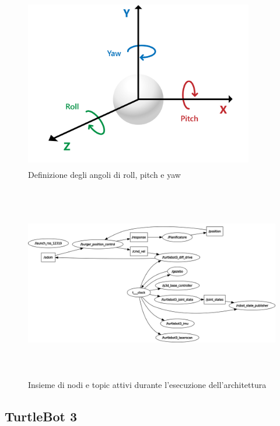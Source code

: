 \documentclass[a4paper,11 pt,oneside]{book}
\theoremstyle{definition}
\begin{document}
\begin{figure}[htbp]
\includegraphics[width=10cm, height=7.5cm]{quaternione.png}
\centering
\caption{Definizione degli angoli di roll, pitch e yaw}
\label{quaternione}
\end{figure}
\begin{figure}[htbp]
\centering
\includegraphics[width=13cm, height=8.5cm]{rosgraph.png}
\caption{Insieme di nodi e topic attivi durante l'esecuzione dell'architettura}
\label{rqt-graph}
\end{figure}
\vspace{5cm}


\subsection{TurtleBot 3}
\end{document}
